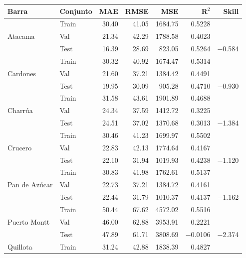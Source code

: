\begin{table}[htbp]
    \centering
    \small
    \begin{tabular}{llrrrrr}
        \toprule
        Barra & Conjunto & MAE & RMSE & MSE & R$^2$ & Skill \\
        \midrule
        \multirow{3}{*}{Atacama}
            & Train & 30.40 & 41.05 & 1684.75 &  0.5228 & \\
            & Val   & 21.34 & 42.29 & 1788.58 &  0.4023 & \\
            & Test  & 16.39 & 28.69 &  823.05 &  0.5264 & $-$0.584 \\
        \midrule
        \multirow{3}{*}{Cardones}
            & Train & 30.32 & 40.92 & 1674.47 &  0.5314 & \\
            & Val   & 21.60 & 37.21 & 1384.42 &  0.4491 & \\
            & Test  & 19.95 & 30.09 &  905.28 &  0.4710 & $-$0.930 \\
        \midrule
        \multirow{3}{*}{Charrúa}
            & Train & 31.58 & 43.61 & 1901.89 &  0.4688 & \\
            & Val   & 24.34 & 37.59 & 1412.72 &  0.3225 & \\
            & Test  & 24.51 & 37.02 & 1370.68 &  0.3013 & $-$1.384 \\
        \midrule
        \multirow{3}{*}{Crucero}
            & Train & 30.46 & 41.23 & 1699.97 &  0.5502 & \\
            & Val   & 22.83 & 42.13 & 1774.64 &  0.4167 & \\
            & Test  & 22.10 & 31.94 & 1019.93 &  0.4238 & $-$1.120 \\
        \midrule
        \multirow{3}{*}{Pan de Azúcar}
            & Train & 30.83 & 41.98 & 1762.61 &  0.5137 & \\
            & Val   & 22.73 & 37.21 & 1384.72 &  0.4161 & \\
            & Test  & 22.44 & 31.79 & 1010.37 &  0.4137 & $-$1.162 \\
        \midrule
        \multirow{3}{*}{Puerto Montt}
            & Train & 50.44 & 67.62 & 4572.02 &  0.5516 & \\
            & Val   & 46.00 & 62.88 & 3953.91 &  0.2221 & \\
            & Test  & 47.89 & 61.71 & 3808.69 & $-$0.0106 & $-$2.374 \\
        \midrule
        \multirow{3}{*}{Quillota}
            & Train & 31.24 & 42.88 & 1838.39 &  0.4827 & \\

\end{tabular}
\end{table}
